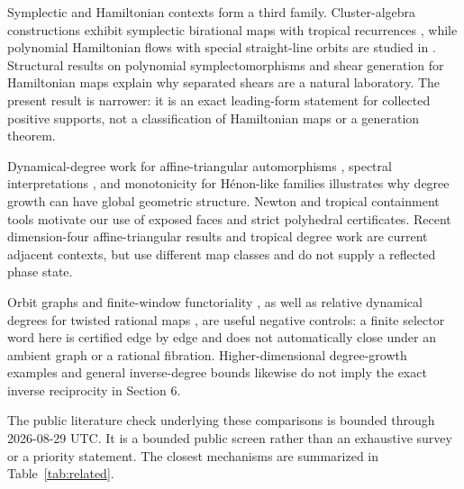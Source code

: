 \documentclass[11pt]{article}
\theoremstyle{definition}
\theoremstyle{remark}
\begin{document}
Symplectic and Hamiltonian contexts form a third family.  Cluster-algebra
constructions exhibit symplectic birational maps with tropical recurrences
\cite{fordy_hone_2011}, while polynomial Hamiltonian flows with special
straight-line orbits are studied in \cite{koch_lomeli_2014}.  Structural
results on polynomial symplectomorphisms
\cite{janeczko_jelonek_2008} and shear generation for Hamiltonian maps
\cite{berger_turaev_2025} explain why separated shears are a natural
laboratory.  The present result is narrower: it is an exact leading-form
statement for collected positive supports, not a classification of
Hamiltonian maps or a generation theorem.

Dynamical-degree work for affine-triangular automorphisms
\cite{blanc_van_santen_2022}, spectral interpretations
\cite{dang_favre_2021}, and monotonicity for Hénon-like families
\cite{bianchi_dinh_rakhimov_2024} illustrates why degree growth can have
global geometric structure.  Newton and tropical containment tools
\cite{el_hilany_2024,grigoriev_containment} motivate our use of exposed
faces and strict polyhedral certificates.  Recent dimension-four
affine-triangular results \cite{shao_sun_2025} and tropical degree work
\cite{nisse_2026} are current adjacent contexts, but use different map
classes and do not supply a reflected phase state.

Orbit graphs and finite-window functoriality
\cite{takenawa_2026}, as well as relative dynamical degrees for twisted
rational maps \cite{abboud_xie_2026}, are useful negative controls: a finite
selector word here is certified edge by edge and does not automatically
close under an ambient graph or a rational fibration.  Higher-dimensional
degree-growth examples \cite{deserti_2018} and general inverse-degree bounds
\cite{cheng_wang_yu_1994} likewise do not imply the exact inverse
reciprocity in Section 6.

The public literature check underlying these comparisons is bounded through
2026-08-29 UTC.  It is a bounded public screen rather than an exhaustive
survey or a priority statement.  The closest mechanisms are summarized in
Table~\ref{tab:related}.
\end{document}
